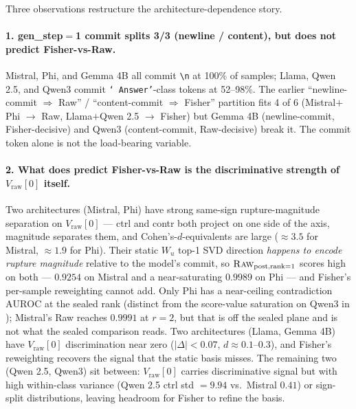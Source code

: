 \documentclass[10pt, letterpaper]{article}
\newcommand{\Wu}{W_u}
\newcommand{\auroc}{\text{AUROC}}
\begin{document}
Three observations restructure the architecture-dependence story.

\paragraph{1. gen\_step$=$1 commit splits 3/3 (newline / content), but
does not predict Fisher-vs-Raw.} Mistral, Phi, and Gemma 4B all commit
\texttt{\textbackslash n} at 100\% of samples; Llama, Qwen 2.5, and
Qwen3 commit \texttt{` Answer'}-class tokens at 52--98\%. The earlier
``newline-commit $\Rightarrow$ Raw'' / ``content-commit $\Rightarrow$
Fisher'' partition fits 4 of 6 (Mistral$+$Phi $\to$ Raw,
Llama$+$Qwen 2.5 $\to$ Fisher) but Gemma 4B (newline-commit,
Fisher-decisive) and Qwen3 (content-commit, Raw-decisive) break it.
The commit token alone is not the load-bearing variable.

\paragraph{2. What does predict Fisher-vs-Raw is the discriminative
strength of $V_\text{raw}[0]$ itself.} Two architectures (Mistral, Phi)
have strong same-sign rupture-magnitude separation on $V_\text{raw}[0]$
--- ctrl and contr both project on one side of the axis, magnitude
separates them, and Cohen's-$d$-equivalents are large ($\approx 3.5$
for Mistral, $\approx 1.9$ for Phi). Their static $\Wu$ top-1 SVD
direction \emph{happens to encode rupture magnitude} relative to the
model's commit, so $\textsc{Raw}_\text{post,rank=1}$ scores high on
both --- $0.9254$ on Mistral and a near-saturating $0.9989$ on Phi ---
and Fisher's per-sample reweighting cannot add. Only Phi has a
near-ceiling contradiction $\auroc$ at the sealed rank (distinct from
the score-value saturation on Qwen3 in );
Mistral's Raw reaches $0.9991$ at
$r{=}2$, but that is off the sealed plane and is not what the sealed
comparison reads. Two architectures (Llama, Gemma 4B) have $V_\text{raw}[0]$
discrimination near zero ($|\Delta| < 0.07$, $d \approx 0.1$--$0.3$),
and Fisher's reweighting recovers the signal that the static basis
misses. The remaining two (Qwen 2.5, Qwen3) sit between:
$V_\text{raw}[0]$ carries discriminative signal but with high
within-class variance (Qwen 2.5 ctrl std $= 9.94$ vs.\ Mistral $0.41$)
or sign-split distributions, leaving headroom for Fisher to refine
the basis.
\end{document}
